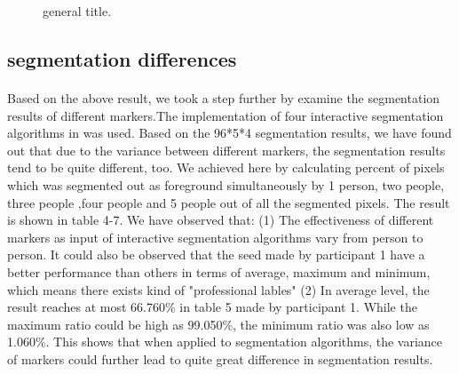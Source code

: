 \documentclass[runningheads,a4paper]{llncs}
\begin{document}
\begin{figure}
\centering

\caption{ general title. }     
\label{fig}     
\end{figure}


\subsection{segmentation differences}
\paragraph{}Based on the above result, we took a step further by examine the segmentation results of different markers.The implementation of four interactive segmentation algorithms in \citep{gulshan2010geodesic} was used. Based on the 96*5*4 segmentation results, we have found out that due to the variance between different markers, the segmentation results tend to be quite different, too.  We achieved here by calculating percent of pixels which was segmented out as foreground simultaneously by 1 person, two people, three people ,four people and 5 people out of all the segmented pixels. The result is shown in table 4-7. We have observed that: (1) The effectiveness of different markers as input of interactive segmentation algorithms vary from person to person.  It could also be observed that the seed made by participant 1 have a better performance than others in terms of average, maximum and minimum, which means there exists kind of "professional lables" \citep{fu2008saliency} (2) In average level, the result reaches at most 66.760\% in table 5 made by participant 1. While the maximum ratio could be high as 99.050\%, the minimum ratio was also low as 1.060\%. This shows that when applied to segmentation algorithms, the variance of markers could further lead to quite great difference in segmentation results. 
\end{document}
